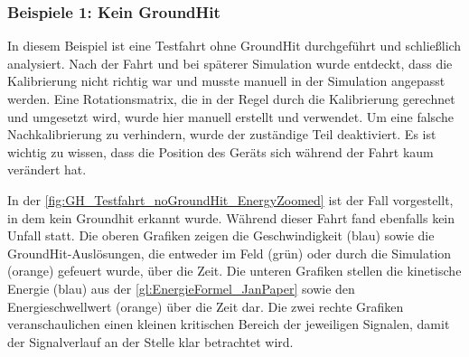 \subsubsection{Beispiele 1: Kein GroundHit}
In diesem Beispiel ist eine Testfahrt ohne GroundHit durchgeführt und schließlich analysiert. Nach der Fahrt und bei späterer Simulation wurde entdeckt, dass die Kalibrierung nicht richtig war und musste manuell in der Simulation angepasst werden. Eine Rotationsmatrix, die in der Regel durch die Kalibrierung gerechnet und umgesetzt wird, wurde hier manuell erstellt und verwendet. Um eine falsche Nachkalibrierung zu verhindern, wurde der zuständige Teil deaktiviert. Es ist wichtig zu wissen, dass die Position des Geräts sich während der Fahrt kaum verändert hat.



In der \autoref{fig:GH_Testfahrt_noGroundHit_EnergyZoomed} ist der Fall vorgestellt, in dem kein Groundhit erkannt wurde. Während dieser Fahrt fand ebenfalls kein Unfall statt. 
Die oberen Grafiken zeigen die Geschwindigkeit (blau) sowie die GroundHit-Auslösungen, die entweder im Feld (grün) oder durch die Simulation (orange) gefeuert wurde, über die Zeit.
Die unteren Grafiken stellen die kinetische Energie (blau) aus der \autoref{gl:EnergieFormel_JanPaper} sowie den Energieschwellwert (orange) über die Zeit dar.
Die zwei rechte Grafiken veranschaulichen einen kleinen kritischen Bereich der jeweiligen Signalen, damit der Signalverlauf an der Stelle klar betrachtet wird.

